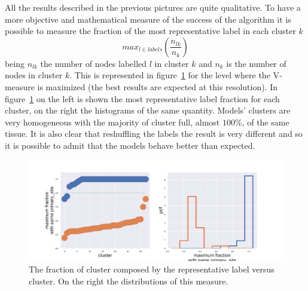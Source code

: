 All the results described in the previous pictures are quite qualitative. To have a more objective and mathematical measure of the success of the algorithm it is possible to measure the fraction of the most representative label in each cluster $k$
\[
max_{l\in labels}\left(\frac{n_{l k}}{n_k}\right)
\]
being $n_{l k}$ the number of nodes labelled $l$ in cluster $k$ and $n_k$ is the number of nodes in cluster $k$. This is represented in figure~\ref{fig:gtex/oversigma_10tissue/shuffledcluster_maximum_l2_primary_site} for the level where the V-measure is maximized (the best results are expected at this resolution). In figure~\ref{fig:gtex/oversigma_10tissue/shuffledcluster_maximum_l2_primary_site} on the left is shown the most representative label fraction for each cluster, on the right the histograms of the same quantity. Models' clusters are very homogeneous with the majority of cluster full, almost $100\%$, of the same tissue. It is also clear that reshuffling the labels the result is very different and so it is possible to admit that the models behave better than expected. 
\begin{figure}[htb!]
    \centering
    \includegraphics[width=0.9\linewidth]{pictures/topic/gtex/oversigma_10tissue/shuffledcluster_maximum_l2_primary_site.pdf}
    \caption{The fraction of cluster composed by the representative label versus cluster. On the right the distributions of this measure.}
    \label{fig:gtex/oversigma_10tissue/shuffledcluster_maximum_l2_primary_site}
\end{figure}

